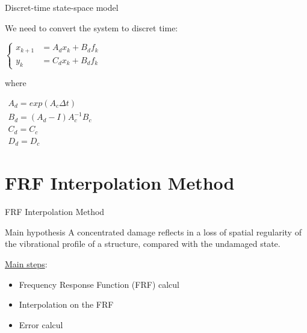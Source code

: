 \documentclass{beamer}
\begin{document}
\begin{frame}{Discret-time state-space model}

We need to convert the system to discret time:

\begin{center}

$\left\{
\begin{array}{ll}
x_{k+1} & = A_dx_k + B_df_k \\
y_k & = C_dx_k + B_df_k
\end{array}
\right.$


\end{center}

where

\begin{center}


$\begin{array}{ll}
A_d = exp(A_c \Delta t) \\
B_d= (A_d - I) A^{-1}_c B_c \\
C_d = C_c \\
D_d = D_c
\end{array}$

\end{center}


\end{frame}

\section{FRF Interpolation Method}


\begin{frame}{FRF Interpolation Method}

\begin{alertblock}{Main hypothesis}
A concentrated damage reflects
in a loss of spatial regularity of the vibrational profile of a
structure, compared with the undamaged state.
\end{alertblock}


\underline{Main steps}:
\begin{itemize}
\item Frequency Response Function (FRF) calcul
\item Interpolation on the FRF
\item Error calcul
\end{itemize}


\end{frame}
\end{document}
